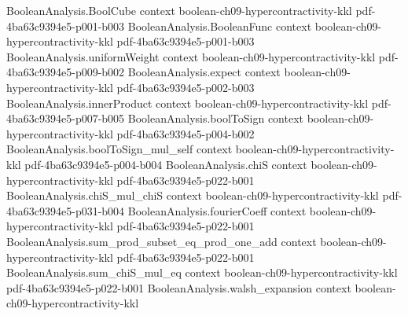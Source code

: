 \begin{theorem}[The $(4/3,2)$-hypercontractive inequality at $\rho=1/\sqrt3$]
\leanok
{}
\label{BooleanAnalysis.Hypercontractivity.hypercontractivity_4_div_3_2}
\proofstep
  {BooleanAnalysis.BoolCube}
  {context}
  {boolean-ch09-hypercontractivity-kkl}
  {pdf-4ba63c9394e5-p001-b003}
\proofstep
  {BooleanAnalysis.BooleanFunc}
  {context}
  {boolean-ch09-hypercontractivity-kkl}
  {pdf-4ba63c9394e5-p001-b003}
\proofstep
  {BooleanAnalysis.uniformWeight}
  {context}
  {boolean-ch09-hypercontractivity-kkl}
  {pdf-4ba63c9394e5-p009-b002}
\proofstep
  {BooleanAnalysis.expect}
  {context}
  {boolean-ch09-hypercontractivity-kkl}
  {pdf-4ba63c9394e5-p002-b003}
\proofstep
  {BooleanAnalysis.innerProduct}
  {context}
  {boolean-ch09-hypercontractivity-kkl}
  {pdf-4ba63c9394e5-p007-b005}
\proofstep
  {BooleanAnalysis.boolToSign}
  {context}
  {boolean-ch09-hypercontractivity-kkl}
  {pdf-4ba63c9394e5-p004-b002}
\proofstep
  {BooleanAnalysis.boolToSign_mul_self}
  {context}
  {boolean-ch09-hypercontractivity-kkl}
  {pdf-4ba63c9394e5-p004-b004}
\proofstep
  {BooleanAnalysis.chiS}
  {context}
  {boolean-ch09-hypercontractivity-kkl}
  {pdf-4ba63c9394e5-p022-b001}
\proofstep
  {BooleanAnalysis.chiS_mul_chiS}
  {context}
  {boolean-ch09-hypercontractivity-kkl}
  {pdf-4ba63c9394e5-p031-b004}
\proofstep
  {BooleanAnalysis.fourierCoeff}
  {context}
  {boolean-ch09-hypercontractivity-kkl}
  {pdf-4ba63c9394e5-p022-b001}
\proofstep
  {BooleanAnalysis.sum_prod_subset_eq_prod_one_add}
  {context}
  {boolean-ch09-hypercontractivity-kkl}
  {pdf-4ba63c9394e5-p022-b001}
\proofstep
  {BooleanAnalysis.sum_chiS_mul_eq}
  {context}
  {boolean-ch09-hypercontractivity-kkl}
  {pdf-4ba63c9394e5-p022-b001}
\proofstep
  {BooleanAnalysis.walsh_expansion}
  {context}
  {boolean-ch09-hypercontractivity-kkl}

\end{theorem}
